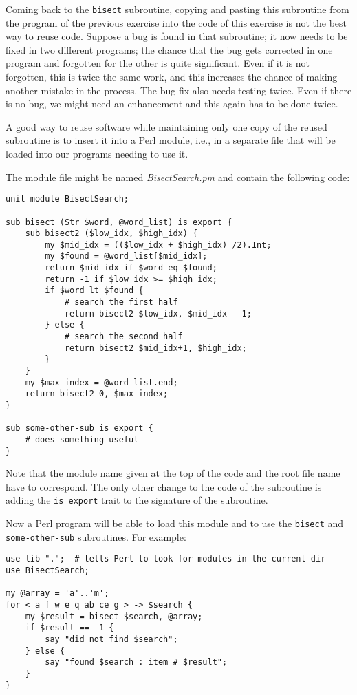 \label{bisect_module}
Coming back to the {\tt bisect} subroutine, copying 
and pasting this subroutine from the program of the 
previous exercise into the code of this exercise is 
not the best way to reuse code. Suppose a bug is 
found in that subroutine; it now needs to be fixed 
in two different programs; the chance that the bug gets 
corrected in one program and forgotten for the other 
is quite significant. Even if it is not forgotten, this 
is twice the same work, and this increases the chance 
of making another mistake in the process. The bug fix 
also needs testing twice. Even if there is no bug, we 
might need an enhancement and this again has to be done 
twice. 

A good way to reuse software while maintaining only 
one copy of the reused subroutine is to insert it into 
a Perl module, i.e., in a separate file that will be 
loaded into our programs needing to use it.

The module file might be named \emph{BisectSearch.pm} 
and contain the following code:

\begin{verbatim}
unit module BisectSearch;

sub bisect (Str $word, @word_list) is export {
    sub bisect2 ($low_idx, $high_idx) {
        my $mid_idx = (($low_idx + $high_idx) /2).Int;
        my $found = @word_list[$mid_idx];
        return $mid_idx if $word eq $found;
        return -1 if $low_idx >= $high_idx;
        if $word lt $found {
            # search the first half
            return bisect2 $low_idx, $mid_idx - 1;
        } else {
            # search the second half
            return bisect2 $mid_idx+1, $high_idx;
        }
    }
    my $max_index = @word_list.end;
    return bisect2 0, $max_index;
}

sub some-other-sub is export {
    # does something useful
}
\end{verbatim}

Note that the module name given at the top of the code 
and the root file name have to correspond. The only other 
change to the code of the subroutine is adding the 
{\tt is export} trait to the signature of the subroutine.

Now a Perl program will be able to load this module 
and to use the {\tt bisect} and {\tt some-other-sub} 
subroutines. For example:
\begin{verbatim}
use lib ".";  # tells Perl to look for modules in the current dir
use BisectSearch;

my @array = 'a'..'m';
for < a f w e q ab ce g > -> $search { 
    my $result = bisect $search, @array;
    if $result == -1 {
        say "did not find $search";
    } else {
        say "found $search : item # $result";
    }
}
\end{verbatim}
%


